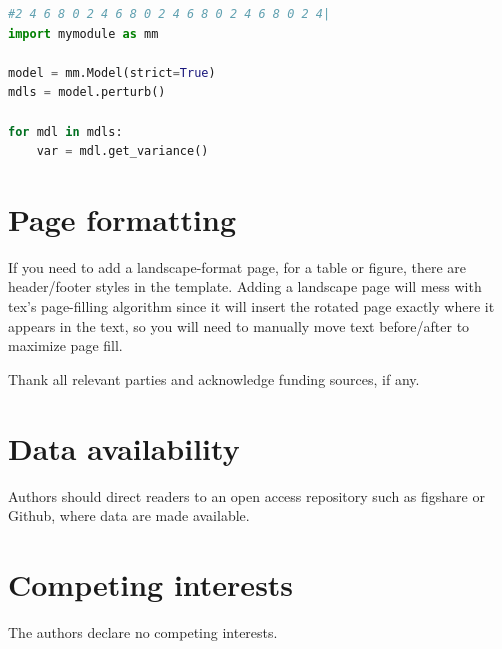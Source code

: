 \documentclass[breakmath,report,languages={french,japanese,arabic}]{seismica}
\begin{document}
\begin{lstlisting}[caption=Example use of \code{Model}, label=code, language=Python]
#2 4 6 8 0 2 4 6 8 0 2 4 6 8 0 2 4 6 8 0 2 4|
import mymodule as mm

model = mm.Model(strict=True)
mdls = model.perturb()

for mdl in mdls:
	var = mdl.get_variance()
\end{lstlisting}

\section{Page formatting}
If you need to add a landscape-format page, for a table or figure, there are header/footer styles in the template. Adding a landscape page will mess with tex's page-filling algorithm since it will insert the rotated page exactly where it appears in the text, so you will need to manually move text before/after to maximize page fill.






\begin{acknowledgements}
	Thank all relevant parties and acknowledge funding sources, if any.
\end{acknowledgements}
	
\section*{Data availability}
Authors should direct readers to an open access repository such as figshare or Github, where data are made available.

\section*{Competing interests}
The authors declare no competing interests.

 
	
\end{document}
